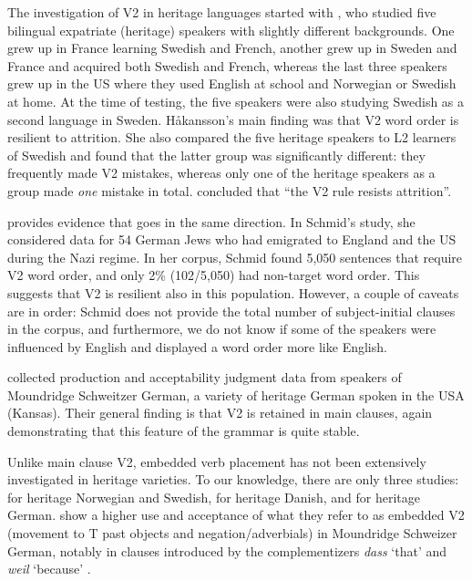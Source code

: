\documentclass[output=paper]{langscibook}
\begin{document}
The investigation of V2 in heritage languages started with \citet{Håkansson1995}, who studied five bilingual expatriate (heritage) speakers with slightly different backgrounds. One grew up in France learning Swedish and French, another grew up in Sweden and France and acquired both Swedish and French, whereas the last three speakers grew up in the US where they used English at school and Norwegian or Swedish at home. At the time of testing, the five speakers were also studying Swedish as a second language in Sweden. Håkansson’s main finding was that V2 word order is resilient to attrition. She also compared the five heritage speakers to L2 learners of Swedish and found that the latter group was significantly different: they frequently made V2 mistakes, whereas only one of the heritage speakers as a group made \textit{one} mistake in total. \citet[160]{Håkansson1995} concluded that “the V2 rule resists attrition”. 

\citet{Schmid2002} provides evidence that goes in the same direction. In Schmid’s study, she considered data for 54 German Jews who had emigrated to England and the US during the Nazi regime. In her corpus, Schmid found 5,050 sentences that require V2 word order, and only 2\% (102/5,050) had non-target word order. This suggests that V2 is resilient also in this population. However, a couple of caveats are in order: Schmid does not provide the total number of subject\hyp initial clauses in the corpus, and furthermore, we do not know if some of the speakers were influenced by English and displayed a word order more like English.

\citet{HoppPutnam2015} collected production and acceptability judgment data from speakers of Moundridge Schweitzer German, a variety of heritage German spoken in the USA (Kansas). Their general finding is that V2 is retained in main clauses, again demonstrating that this feature of the grammar is quite stable.

Unlike main clause V2, embedded verb placement has not been extensively investigated in heritage varieties. To our knowledge, there are only three studies: \citet{LarssonJohannessen2015Embedded} for heritage Norwegian and Swedish, \citet{Hartling2016} for heritage Danish, and \citet{HoppPutnam2015} for heritage German. \citet{HoppPutnam2015} show a higher use and acceptance of what they refer to as embedded V2 (movement to T past objects and negation/adverbials) in Moundridge Schweizer German, notably in clauses introduced by the complementizers \textit{dass} ‘that’  and \textit{weil} ‘because’ .
\end{document}
